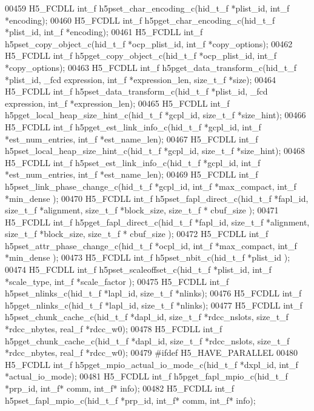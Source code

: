 \begin{DoxyCode}
00459 H5\_FCDLL int\_f h5pset\_char\_encoding\_c(hid\_t\_f *plist\_id, int\_f *encoding);
00460 H5\_FCDLL int\_f h5pget\_char\_encoding\_c(hid\_t\_f *plist\_id, int\_f *encoding);
00461 H5\_FCDLL int\_f h5pset\_copy\_object\_c(hid\_t\_f *ocp\_plist\_id, int\_f *copy\_options);
00462 H5\_FCDLL int\_f h5pget\_copy\_object\_c(hid\_t\_f *ocp\_plist\_id, int\_f *copy\_options);
00463 H5\_FCDLL int\_f h5pget\_data\_transform\_c(hid\_t\_f *plist\_id, \_fcd expression, int\_f *expression\_len, size\_t\_f 
      *size);
00464 H5\_FCDLL int\_f h5pset\_data\_transform\_c(hid\_t\_f *plist\_id, \_fcd expression, int\_f *expression\_len);
00465 H5\_FCDLL int\_f h5pget\_local\_heap\_size\_hint\_c(hid\_t\_f *gcpl\_id, size\_t\_f *size\_hint);
00466 H5\_FCDLL int\_f h5pget\_est\_link\_info\_c(hid\_t\_f *gcpl\_id, int\_f *est\_num\_entries, int\_f *est\_name\_len);
00467 H5\_FCDLL int\_f h5pset\_local\_heap\_size\_hint\_c(hid\_t\_f *gcpl\_id, size\_t\_f *size\_hint);
00468 H5\_FCDLL int\_f h5pset\_est\_link\_info\_c(hid\_t\_f *gcpl\_id, int\_f *est\_num\_entries, int\_f *est\_name\_len);
00469 H5\_FCDLL int\_f h5pset\_link\_phase\_change\_c(hid\_t\_f *gcpl\_id, int\_f *max\_compact, int\_f *min\_dense );
00470 H5\_FCDLL int\_f h5pset\_fapl\_direct\_c(hid\_t\_f *fapl\_id, size\_t\_f *alignment, size\_t\_f *block\_size, size\_t\_f *
      cbuf\_size );
00471 H5\_FCDLL int\_f h5pget\_fapl\_direct\_c(hid\_t\_f *fapl\_id, size\_t\_f *alignment, size\_t\_f *block\_size, size\_t\_f *
      cbuf\_size );
00472 H5\_FCDLL int\_f h5pset\_attr\_phase\_change\_c(hid\_t\_f *ocpl\_id, int\_f *max\_compact, int\_f *min\_dense );
00473 H5\_FCDLL int\_f h5pset\_nbit\_c(hid\_t\_f *plist\_id );
00474 H5\_FCDLL int\_f h5pset\_scaleoffset\_c(hid\_t\_f *plist\_id, int\_f *scale\_type, int\_f *scale\_factor );
00475 H5\_FCDLL int\_f h5pset\_nlinks\_c(hid\_t\_f *lapl\_id, size\_t\_f *nlinks);
00476 H5\_FCDLL int\_f h5pget\_nlinks\_c(hid\_t\_f *lapl\_id, size\_t\_f *nlinks);
00477 H5\_FCDLL int\_f h5pset\_chunk\_cache\_c(hid\_t\_f *dapl\_id, size\_t\_f *rdcc\_nslots, size\_t\_f *rdcc\_nbytes, real\_f 
      *rdcc\_w0);
00478 H5\_FCDLL int\_f h5pget\_chunk\_cache\_c(hid\_t\_f *dapl\_id, size\_t\_f *rdcc\_nslots, size\_t\_f *rdcc\_nbytes, real\_f 
      *rdcc\_w0);
00479 \textcolor{preprocessor}{#ifdef H5\_HAVE\_PARALLEL}
00480 H5\_FCDLL int\_f h5pget\_mpio\_actual\_io\_mode\_c(hid\_t\_f *dxpl\_id, int\_f *actual\_io\_mode);
00481 H5\_FCDLL int\_f h5pget\_fapl\_mpio\_c(hid\_t\_f *prp\_id, int\_f* comm, int\_f* info);
00482 H5\_FCDLL int\_f h5pset\_fapl\_mpio\_c(hid\_t\_f *prp\_id, int\_f* comm, int\_f* info);

\end{DoxyCode}
